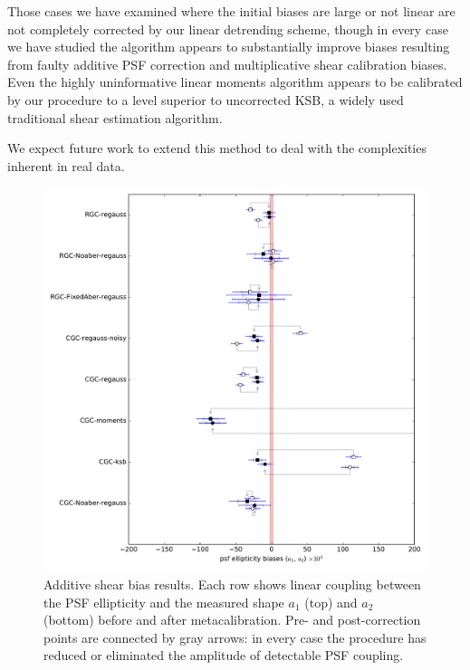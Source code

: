 \documentclass[iop]{emulateapj}
\begin{document}
Those cases we have examined where the initial biases are large or not
linear are not completely corrected by our linear detrending scheme,
though in every case we have studied the algorithm appears to
substantially improve biases resulting from faulty additive PSF
correction and multiplicative shear calibration biases. Even the
highly uninformative linear moments algorithm appears to be calibrated
by our procedure to a level superior to uncorrected KSB, a widely used
traditional shear estimation algorithm.

We expect future work to extend this method to deal with the
complexities inherent in real data.

\begin{figure}[t]
\begin{center}
\includegraphics[width=0.8\linewidth]{a_results_linear.pdf}
\end{center}
\caption{Additive shear bias results. Each row shows linear coupling
  between the PSF ellipticity and the measured shape $a_1$ (top) and
  $a_2$ (bottom) before and after metacalibration. Pre- and
  post-correction points are connected by gray arrows: in every case
  the procedure has reduced or eliminated the amplitude of detectable
  PSF coupling.}
\label{fig:a_results}
\end{figure}
\end{document}
